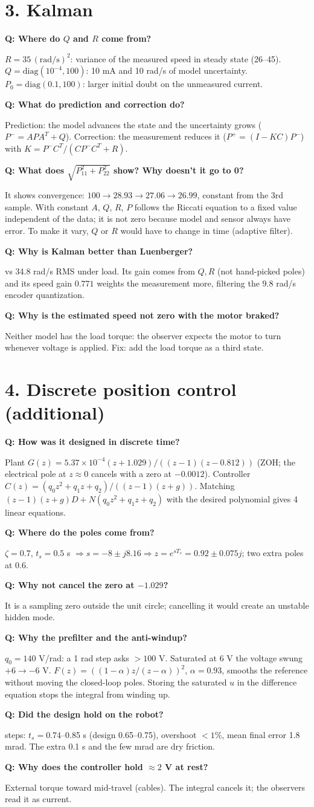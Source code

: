 \documentclass[9pt,a4paper,twocolumn]{extarticle}
\newcommand{\q}[1]{\par\smallskip\noindent\textbf{Q: #1}\par\noindent}
\begin{document}
\section{3. Kalman}
\q{Where do $Q$ and $R$ come from?}
$R=35\,(\mathrm{rad/s})^2$: variance of the measured speed in steady state (26--45). $Q=\mathrm{diag}(10^{-4},100)$: 10 mA and 10 rad/s of model uncertainty. $P_0=\mathrm{diag}(0.1,100)$: larger initial doubt on the unmeasured current.
\q{What do prediction and correction do?}
Prediction: the model advances the state and the uncertainty grows ($P^-=APA^T+Q$). Correction: the measurement reduces it ($P^+=(I-KC)P^-$) with $K=P^-C^T/(CP^-C^T+R)$.
\q{What does $\sqrt{P_{11}^2+P_{22}^2}$ show? Why doesn't it go to 0?}
It shows convergence: $100\to28.93\to27.06\to26.99$, constant from the 3rd sample. With constant $A$, $Q$, $R$, $P$ follows the Riccati equation to a fixed value independent of the data; it is not zero because model and sensor always have error. To make it vary, $Q$ or $R$ would have to change in time (adaptive filter).
\q{Why is Kalman better than Luenberger?}
7.8 vs 34.8 rad/s RMS under load. Its gain comes from $Q,R$ (not hand-picked poles) and its speed gain $0.771$ weights the measurement more, filtering the 9.8 rad/s encoder quantization.
\q{Why is the estimated speed not zero with the motor braked?}
Neither model has the load torque: the observer expects the motor to turn whenever voltage is applied. Fix: add the load torque as a third state.

\section{4. Discrete position control (additional)}
\q{How was it designed in discrete time?}
Plant $G(z)=5.37{\times}10^{-4}(z+1.029)/((z-1)(z-0.812))$ (ZOH; the electrical pole at $z\approx0$ cancels with a zero at $-0.0012$). Controller $C(z)=(q_0z^2+q_1z+q_2)/((z-1)(z+g))$. Matching $(z-1)(z+g)D+N(q_0z^2+q_1z+q_2)$ with the desired polynomial gives 4 linear equations.
\q{Where do the poles come from?}
$\zeta=0.7$, $t_s=0.5$ s $\Rightarrow s=-8\pm j8.16 \Rightarrow z=e^{sT_s}=0.92\pm0.075j$; two extra poles at 0.6.
\q{Why not cancel the zero at $-1.029$?}
It is a sampling zero outside the unit circle; cancelling it would create an unstable hidden mode.
\q{Why the prefilter and the anti-windup?}
$q_0=140$ V/rad: a 1 rad step asks $>100$ V. Saturated at 6 V the voltage swung $+6\to-6$ V. $F(z)=((1-\alpha)z/(z-\alpha))^2$, $\alpha=0.93$, smooths the reference without moving the closed-loop poles. Storing the saturated $u$ in the difference equation stops the integral from winding up.
\q{Did the design hold on the robot?}
27 steps: $t_s=0.74$--0.85 s (design 0.65--0.75), overshoot $<1\%$, mean final error 1.8 mrad. The extra 0.1 s and the few mrad are dry friction.
\q{Why does the controller hold $\approx2$ V at rest?}
External torque toward mid-travel (cables). The integral cancels it; the observers read it as current.
\end{document}
